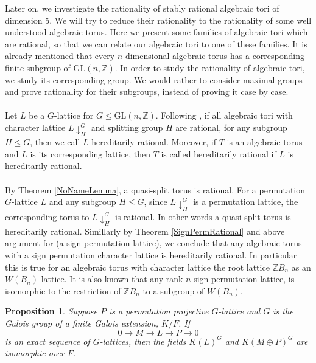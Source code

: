 \documentclass[a4paper, 14pt]{extarticle}
\theoremstyle{plain}
\newtheorem{proposition}[theorem]{Proposition}
\theoremstyle{definition}
\newcommand{\Z}{\ensuremath{\mathbb{Z}}}
\begin{document}
Later on, we investigate the rationality of stably rational algebraic tori 
of dimension 5.  We will try to reduce their rationality to the rationality of some 
well understood algebraic torus. Here we present some families of 
algebraic tori which are rational, so that we can relate our algebraic tori to one 
of these families. It is already mentioned that every $n$ dimensional algebraic torus 
has a corresponding finite subgroup of $\mathrm{GL}(n,\Z)$. In order to study the 
rationality of algebraic tori, we study its corresponding group. We would rather to 
consider maximal groups and prove rationality for their subgroups, instead of proving 
it case by case. \\
\\
Let $L$ be a $G$-lattice for $G\leq \mathrm{GL}(n,\Z)$. Following \cite{Nicole1}, if all algebraic tori with character lattice $L\downarrow_H^G$ and splitting group $H$ are rational, for any 
subgroup $H \leq G$, then we call $L$ hereditarily rational. 
Moreover, if $T$ is an algebraic torus and $L$ is its corresponding lattice, then $T$ is called 
hereditarily rational if $L$ is hereditarily rational.
\\
\\
By Theorem \ref{NoNameLemma}, a quasi-split torus is rational. For a permutation 
$G$-lattice $L$ and any subgroup $H\leq G$, since $L\downarrow_H^G$ is a permutation 
lattice, the corresponding torus to $L\downarrow_H^G$ is rational. In other words a 
quasi split torus is hereditarily rational. Simillarly by Theorem \ref{SignPermRational} 
and above argument for (a sign permutation lattice), we conclude that any algebraic 
torus with a sign permutation character lattice is hereditarily rational. 
In particular this is true for an algebraic torus with character lattice the root 
lattice $\Z B_n$ as an $W(B_n)$-lattice. It is also known that any rank $n$ sign 
permutation lattice, is isomorphic to the restriction of $\Z B_n$ to a subgroup 
of $W(B_n)$. 
\begin{proposition}\cite[Proposition 1.5]{Lenstra}
Suppose $P$ is a permutation projective $G$-lattice and $G$ is the Galois group 
of a finite Galois extension, $K/F$. If 
$$0 \longrightarrow M \longrightarrow L \longrightarrow P \longrightarrow 0 $$ is 
an exact sequence of $G$-lattices, then the fields $K(L)^G$ and $K(M \oplus P)^G$ are isomorphic over $F$. 
\end{proposition}
\end{document}
